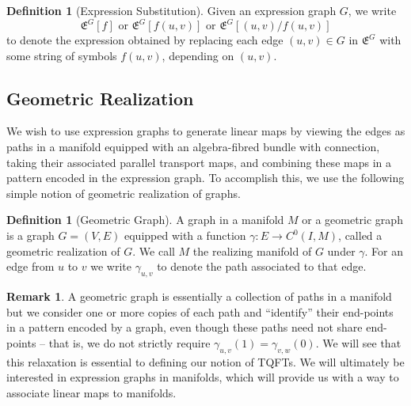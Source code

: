 \documentclass{amsart}
\renewcommand{\to}[1][]{\stackrel{#1}{\longrightarrow}}
\newcommand{\Exp}[1]{\mathfrak{E}^{#1}}
\numberwithin{thm}{section}
\theoremstyle{definition}
\newtheorem{defn}[thm]{Definition}
\newtheorem{rmk}[thm]{Remark}
\begin{document}
\begin{defn}[Expression Substitution]
Given an expression graph $G$, we write
\[
  \Exp{G}[f] \text{ or } \Exp{G}[f(u, v)] \text{ or } \Exp{G}[(u, v)/f(u, v)]
\]
to denote the expression obtained by replacing each edge $(u, v) \in G$ in
$\Exp{G}$ with some string of symbols $f(u, v)$, depending on $(u, v)$.
\end{defn}

%

\subsection{Geometric Realization}

We wish to use expression graphs to generate linear maps by viewing the edges as
paths in a manifold equipped with an algebra-fibred bundle with connection,
taking their associated parallel transport maps, and combining these maps in a
pattern encoded in the expression graph. To accomplish this, we use the
following simple notion of geometric realization of graphs.

\begin{defn}[Geometric Graph]
A graph in a manifold $M$ or a geometric graph is a graph $G = (V, E)$ equipped
with a function $\gamma : E \to C^0(I, M)$, called a geometric realization of
$G$. We call $M$ the realizing manifold of $G$ under $\gamma$. For an edge from
$u$ to $v$ we write $\gamma_{u, v}$ to denote the path associated to that edge.
\end{defn}

\begin{rmk}
A geometric graph is essentially a collection of paths in a manifold but we
consider one or more copies of each path and ``identify'' their end-points in a
pattern encoded by a graph, even though these paths need not share end-points --
that is, we do not strictly require $\gamma_{u, v}(1) = \gamma_{v, w}(0)$. We
will see that this relaxation is essential to defining our notion of TQFTs. We
will ultimately be interested in expression graphs in manifolds, which will
provide us with a way to associate linear maps to manifolds.
\end{rmk}
\end{document}
